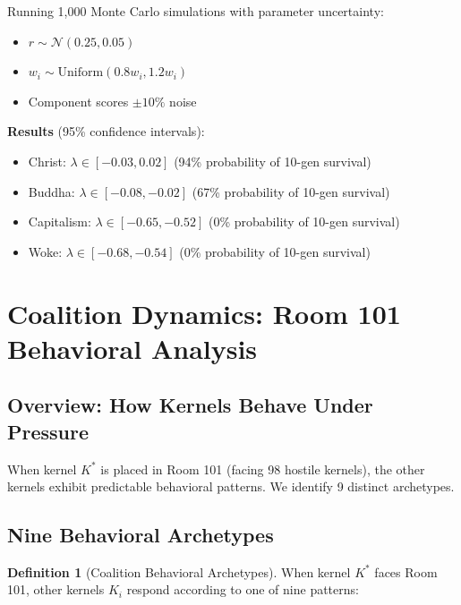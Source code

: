 \documentclass[11pt,a4paper]{article}
\theoremstyle{definition}
\newtheorem{definition}[theorem]{Definition}
\theoremstyle{remark}
\begin{document}
Running 1,000 Monte Carlo simulations with parameter uncertainty:
\begin{itemize}
    \item $r \sim \mathcal{N}(0.25, 0.05)$
    \item $w_i \sim \text{Uniform}(0.8w_i, 1.2w_i)$
    \item Component scores $\pm 10\%$ noise
\end{itemize}

\textbf{Results} (95\% confidence intervals):
\begin{itemize}
    \item Christ: $\lambda \in [-0.03, 0.02]$ (94\% probability of 10-gen survival)
    \item Buddha: $\lambda \in [-0.08, -0.02]$ (67\% probability of 10-gen survival)
    \item Capitalism: $\lambda \in [-0.65, -0.52]$ (0\% probability of 10-gen survival)
    \item Woke: $\lambda \in [-0.68, -0.54]$ (0\% probability of 10-gen survival)
\end{itemize}

\newpage

\section{Coalition Dynamics: Room 101 Behavioral Analysis}

\subsection{Overview: How Kernels Behave Under Pressure}

When kernel $K^*$ is placed in Room 101 (facing 98 hostile kernels), the other kernels exhibit predictable behavioral patterns. We identify 9 distinct archetypes.

\subsection{Nine Behavioral Archetypes}

\begin{definition}[Coalition Behavioral Archetypes]
\label{def:archetypes}
When kernel $K^*$ faces Room 101, other kernels $K_i$ respond according to one of nine patterns:
\end{definition}
\end{document}
